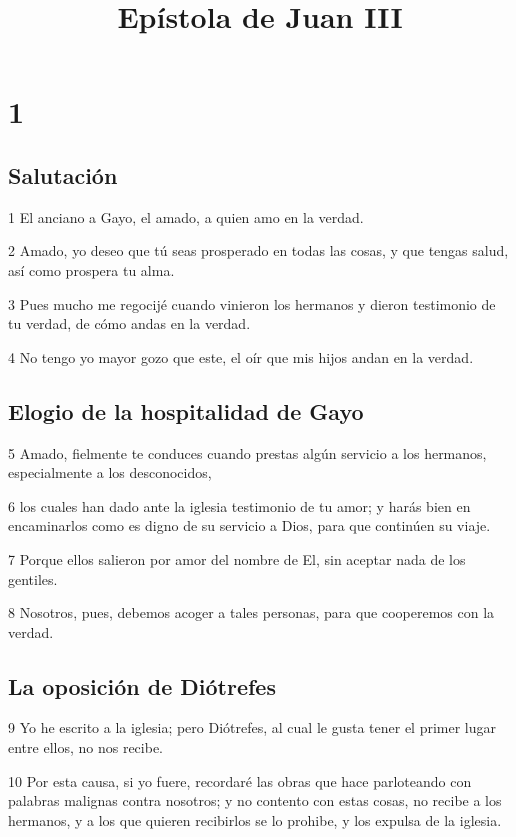 
\title{Epístola de Juan III}

\chapter{1}

\section*{Salutación}

\par 1 El anciano a Gayo, el amado, a quien amo en la verdad.
\par 2 Amado, yo deseo que tú seas prosperado en todas las cosas, y que tengas salud, así como prospera tu alma.
\par 3 Pues mucho me regocijé cuando vinieron los hermanos y dieron testimonio de tu verdad, de cómo andas en la verdad.
\par 4 No tengo yo mayor gozo que este, el oír que mis hijos andan en la verdad.

\section*{Elogio de la hospitalidad de Gayo}

\par 5 Amado, fielmente te conduces cuando prestas algún servicio a los hermanos, especialmente a los desconocidos,
\par 6 los cuales han dado ante la iglesia testimonio de tu amor; y harás bien en encaminarlos como es digno de su servicio a Dios, para que continúen su viaje.
\par 7 Porque ellos salieron por amor del nombre de El, sin aceptar nada de los gentiles.
\par 8 Nosotros, pues, debemos acoger a tales personas, para que cooperemos con la verdad.

\section*{La oposición de Diótrefes}

\par 9 Yo he escrito a la iglesia; pero Diótrefes, al cual le gusta tener el primer lugar entre ellos, no nos recibe.
\par 10 Por esta causa, si yo fuere, recordaré las obras que hace parloteando con palabras malignas contra nosotros; y no contento con estas cosas, no recibe a los hermanos, y a los que quieren recibirlos se lo prohibe, y los expulsa de la iglesia.

